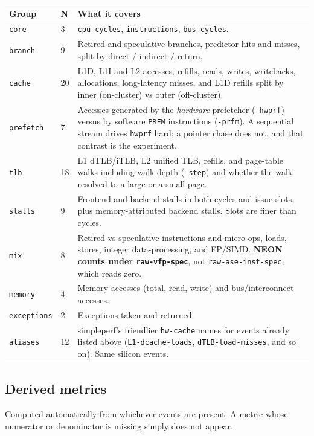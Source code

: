 \documentclass[11pt,a4paper]{article}
\newcommand{\code}[1]{\texttt{\let\_\breakableunderscore #1}}
\newcommand{\breakableunderscore}{\textunderscore\allowbreak}
\begin{document}
\begin{longtable}{@{}p{2.2cm}p{0.9cm}p{11.4cm}@{}}
\toprule
\textbf{Group} & \textbf{N} & \textbf{What it covers} \\
\midrule
\endhead
\code{core} & 3 & \code{cpu-cycles}, \code{instructions}, \code{bus-cycles}. \\
\code{branch} & 9 & Retired and speculative branches, predictor hits and
  misses, split by direct / indirect / return. \\
\code{cache} & 20 & L1D, L1I and L2 accesses, refills, reads, writes,
  writebacks, allocations, long-latency misses, and L1D refills split by inner
  (on-cluster) vs outer (off-cluster). \\
\code{prefetch} & 7 & Accesses generated by the \emph{hardware} prefetcher
  (\code{*-hwprf}) versus by software \code{PRFM} instructions
  (\code{*-prfm}). A sequential stream drives \code{hwprf} hard; a pointer
  chase does not, and that contrast is the experiment. \\
\code{tlb} & 18 & L1 dTLB/iTLB, L2 unified TLB, refills, and page-table walks
  including walk depth (\code{*-step}) and whether the walk resolved to a large
  or a small page. \\
\code{stalls} & 9 & Frontend and backend stalls in both cycles and issue slots,
  plus memory-attributed backend stalls. Slots are finer than cycles. \\
\code{mix} & 8 & Retired vs speculative instructions and micro-ops, loads,
  stores, integer data-processing, and FP/SIMD. \textbf{NEON counts under
  \code{raw-vfp-spec}}, not \code{raw-ase-inst-spec}, which reads zero. \\
\code{memory} & 4 & Memory accesses (total, read, write) and bus/interconnect
  accesses. \\
\code{exceptions} & 2 & Exceptions taken and returned. \\
\code{aliases} & 12 & simpleperf's friendlier \code{hw-cache} names for events
  already listed above (\code{L1-dcache-loads}, \code{dTLB-load-misses}, and so
  on). Same silicon events. \\
\bottomrule
\end{longtable}

\subsection{Derived metrics}

Computed automatically from whichever events are present. A metric whose
numerator or denominator is missing simply does not appear.
\end{document}
